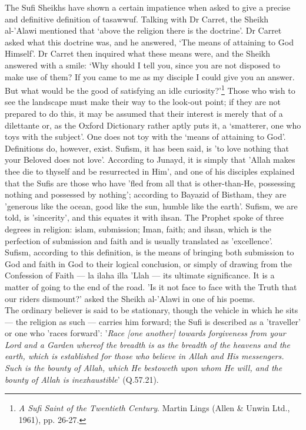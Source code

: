 \documentclass[10pt, twoside,openright]{book}
\begin{document}
The Sufi Sheikhs have shown a certain impatience when asked to give a precise and definitive 
definition of tasawwuf. Talking with Dr Carret, the Sheikh al\hyp{}'Alawi mentioned that `above the 
religion there is the doctrine'. Dr Carret asked what this doctrine was, and he answered, `The means 
of attaining to God Himself'. Dr Carret then inquired what these means were, and the Sheikh answered 
with a smile: `Why should I tell you, since you are not disposed to make use of them? If you came to 
me as my disciple I could give you an answer. But what would be the good of satisfying an idle 									
curiosity?'\footnote{\emph{A Sufi Saint of the Twentieth Century}. Martin Lings (Allen \& Unwin Ltd., 1961), pp. 26-27.} Those who wish to see the landscape must make their way to the look\hyp{}out point; if they 
are not prepared to do this, it may be assumed that their interest is merely that of a dilettante or, 
as the Oxford Dictionary rather aptly puts it, a `smatterer, one who toys with the subject'. One does 
not toy with the `means of attaining to God'. \\

Definitions do, however, exist. Sufism, it has been said, is 'to love nothing that your Beloved does 
not love'. According to Junayd, it is simply that 'Allah makes thee die to thyself and be resurrected 
in Him', and one of his disciples explained that the Sufis are those who have 'fled from all that is 
other\hyp{}than\hyp{}He, possessing nothing and possessed by nothing'; according to Bayazid of Bistham, they 
are 'generous like the ocean, good like the sun, humble like the earth'. Sufism, we are told, is 
'sincerity', and this equates it with ihsan. The Prophet spoke of three degrees in religion: islam, 
submission; Iman, faith; and ihsan, which is the perfection of submission and faith and is usually 
translated as 'excellence'. Sufism, according to this definition, is the means of bringing both 
submission to God and faith in God to their logical conclusion, or simply of drawing from the 
Confession of Faith --- la ilaha illa 'Llah --- its ultimate significance. It is a matter of going to the 
end of the road. 'Is it not face to face with the Truth that our riders dismount?' asked the Sheikh 
al-'Alawi in one of his poems. \\

The ordinary believer is said to be stationary, though the vehicle in which he sits --- the religion as 
such --- carries him forward; the Sufi is described as a 'traveller' or one who 'races forward': '\emph{Race 
[one another] towards forgiveness from your Lord and a Garden whereof the breadth is as the breadth 
of the heavens and the earth, which is established for those who believe in Allah and His messengers. 
Such is the bounty of Allah, which He bestoweth upon whom He will, and the bounty of Allah is 
inexhaustible}' (Q.57.21). \\
\end{document}
